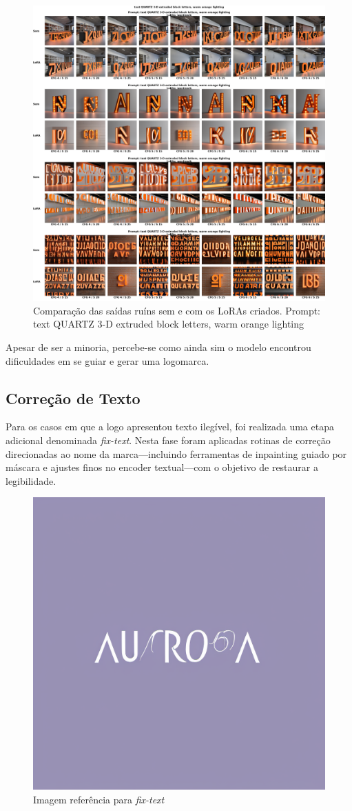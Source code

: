 \documentclass[12pt, %
openright, 
oneside, %
a4paper,    %
brazil]{facom-ufu-abntex2}
\begin{document}
\begin{figure}[H]
    \centering
    \includegraphics[width=1.0\linewidth]{figuras/resultados/bad/grid_p14_all_batches.png}
    \caption[4º Comparação das saídas ruíns sem e com os LoRAs criados.]{Comparação das saídas ruíns sem e com os LoRAs criados. Prompt: text QUARTZ 3-D extruded block letters, warm orange lighting}
    \label{fig:badGridP14AllBatches}
\end{figure}

Apesar de ser a minoria, percebe-se como ainda sim o modelo encontrou dificuldades em se guiar e gerar uma logomarca.

\subsection{Correção de Texto}

Para os casos em que a logo apresentou texto ilegível, foi realizada uma etapa adicional denominada \emph{fix-text}. Nesta fase foram aplicadas rotinas de correção direcionadas ao nome da marca—incluindo ferramentas de inpainting guiado por máscara e ajustes finos no encoder textual—com o objetivo de restaurar a legibilidade.

\begin{figure}[H]
    \centering
    \includegraphics[width=0.35\linewidth]{figuras/resultados/good/fix_text/p2_cfg4_st15_2_lora_0.png}
    \caption[Imagem referência para \emph{fix-text}]{Imagem referência para \emph{fix-text}}
    \label{fig:FixTextP2Cfg4St152Lora0}
\end{figure}
\end{document}
